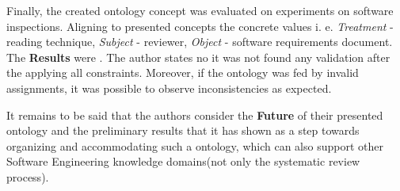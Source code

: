 	Finally, the created ontology concept was evaluated on experiments on software inspections\cite{Bas99}. Aligning to presented concepts the concrete values i. e. \textit{Treatment} - reading technique, \textit{Subject} - reviewer, \textit{Object} - software requirements document. The \textbf{Results} were \frqq\cite[p. 15]{SiyWu12}. The author states no it was not found any validation after the applying all constraints. Moreover, if the ontology was fed by  invalid assignments, it was possible to observe inconsistencies as expected.
	
	It remains to be said that the authors consider the \textbf{Future} of their presented ontology and the preliminary results that it has shown as a step towards organizing and accommodating such a ontology, which can also support other Software Engineering knowledge domains(not only the systematic review process).  \newline
	
